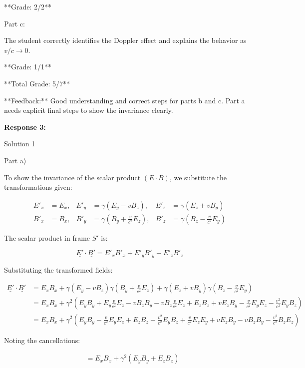 \documentclass[a4paper,11pt]{article}
\begin{document}
**Grade: 2/2**

Part c:

The student correctly identifies the Doppler effect and explains the behavior as \( v/c \rightarrow 0 \).

**Grade: 1/1**

**Total Grade: 5/7**

**Feedback:** Good understanding and correct steps for parts b and c. Part a needs explicit final steps to show the invariance clearly.

\bigskip
\textbf{Response 3:}

Solution 1

Part a)

To show the invariance of the scalar product \((\underline{E} \cdot \underline{B})\), we substitute the transformations given:

\[
\begin{aligned}
E'_{x} &= E_{x}, & E'_{y} &= \gamma(E_{y} - vB_{z}), & E'_{z} &= \gamma(E_{z} + vB_{y}) \\
B'_{x} &= B_{x}, & B'_{y} &= \gamma(B_{y} + \frac{v}{c^{2}} E_{z}), & B'_{z} &= \gamma(B_{z} - \frac{v}{c^{2}} E_{y})
\end{aligned}
\]

The scalar product in frame \(S'\) is:

\[
\underline{E'} \cdot \underline{B'} = E'_{x} B'_{x} + E'_{y} B'_{y} + E'_{z} B'_{z}
\]

Substituting the transformed fields:

\[
\begin{aligned}
\underline{E'} \cdot \underline{B'} &= E_{x} B_{x} + \gamma(E_{y} - vB_{z}) \gamma(B_{y} + \frac{v}{c^{2}} E_{z}) + \gamma(E_{z} + vB_{y}) \gamma(B_{z} - \frac{v}{c^{2}} E_{y}) \\
&= E_{x} B_{x} + \gamma^2 (E_{y} B_{y} + E_{y} \frac{v}{c^{2}} E_{z} - vB_{z} B_{y} - vB_{z} \frac{v}{c^{2}} E_{z} + E_{z} B_{z} + vE_{z} B_{y} - \frac{v}{c^{2}} E_{y} E_{z} - \frac{v^2}{c^{2}} E_{y} B_{z}) \\
&= E_{x} B_{x} + \gamma^2 \left(E_{y} B_{y} - \frac{v}{c^{2}} E_{y} E_{z} + E_{z} B_{z} - \frac{v^2}{c^{2}} E_{y} B_{z} + \frac{v}{c^{2}} E_{z} E_{y} + v E_{z} B_{y} - v B_{z} B_{y} - \frac{v^2}{c^{2}} B_{z} E_{z}\right)
\end{aligned}
\]

Noting the cancellations:

\[
\begin{aligned}
&= E_{x} B_{x} + \gamma^2 \left(E_{y} B_{y} + E_{z} B_{z}\right)
\end{aligned}
\]
\end{document}
